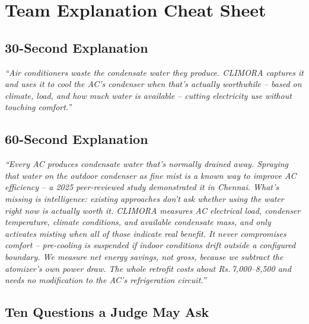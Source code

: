 \documentclass[11pt,a4paper]{article}
\newcommand{\textrupee}{Rs.\,}
\begin{document}
\section{Team Explanation Cheat Sheet}

\subsection*{30-Second Explanation}
\textit{``Air conditioners waste the condensate water they produce. CLIMORA captures it and uses it to cool the AC's condenser when that's actually worthwhile -- based on climate, load, and how much water is available -- cutting electricity use without touching comfort.''}

\subsection*{60-Second Explanation}
\textit{``Every AC produces condensate water that's normally drained away. Spraying that water on the outdoor condenser as fine mist is a known way to improve AC efficiency -- a 2025 peer-reviewed study demonstrated it in Chennai. What's missing is intelligence: existing approaches don't ask whether using the water right now is actually worth it. CLIMORA measures AC electrical load, condenser temperature, climate conditions, and available condensate mass, and only activates misting when all of those indicate real benefit. It never compromises comfort -- pre-cooling is suspended if indoor conditions drift outside a configured boundary. We measure net energy savings, not gross, because we subtract the atomizer's own power draw. The whole retrofit costs about \textrupee7,000--8,500 and needs no modification to the AC's refrigeration circuit.''}

\subsection*{Ten Questions a Judge May Ask}
\end{document}
